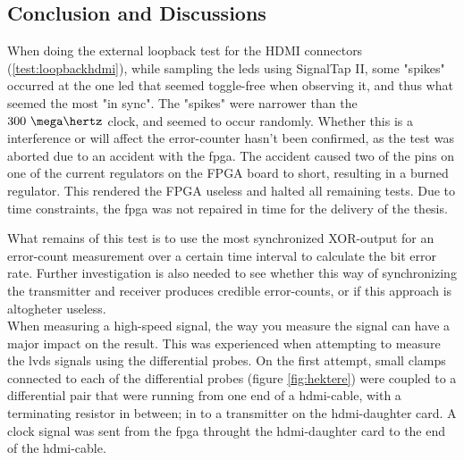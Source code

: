 \documentclass[main.tex]{subfiles}
\begin{document}


\subsection{Conclusion and Discussions}

When doing the external loopback test for the HDMI connectors (\ref{test:loopbackhdmi}), while sampling the \glspl{led} using SignalTap II, some "spikes" occurred at the one \gls{led} that seemed toggle-free when observing it, and thus what seemed the most "in sync". The "spikes" were narrower than the $300~\mega\hertz$ clock, and seemed to occur randomly. Whether this is a interference or will affect the error-counter hasn't been confirmed, as the test was aborted due to an accident with the \gls{fpga}. The accident caused two of the pins on one of the current regulators on the FPGA board to short, resulting in a burned regulator. This rendered the FPGA useless and halted all remaining tests. Due to time constraints, the \gls{fpga} was not repaired in time for the delivery of the thesis.

What remains of this test is to use the most synchronized XOR-output for an error-count measurement over a certain time interval to calculate the bit error rate. Further investigation is also needed to see whether this way of synchronizing the transmitter and receiver produces credible error-counts, or if this approach is altogheter useless.\\

When measuring a high-speed signal, the way you measure the signal can have a major impact on the result. This was experienced when attempting to measure the \gls{lvds} signals using the differential probes. On the first attempt, small clamps connected to each of the differential probes (figure \ref{fig:hektere}) were coupled to a differential pair that were running from one end of a hdmi-cable, with a terminating resistor in between; in to a transmitter on the \gls{hdmi}-daughter card. A clock signal was sent from the \gls{fpga} throught the \gls{hdmi}-daughter card to the end of the hdmi-cable. 
\end{document}
